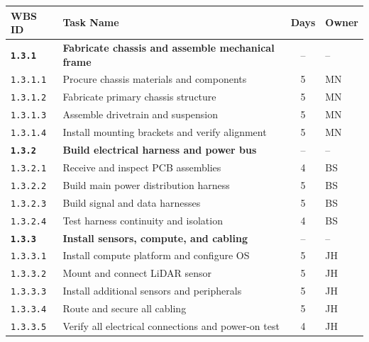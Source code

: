 \newpage
\begin{table}[H]
\centering
\small
\begin{tabular}{|l|p{6.5cm}|c|l|}
\hline
\rowcolor{buildorange!40}
\textbf{WBS ID} & \textbf{Task Name} & \textbf{Days} & \textbf{Owner} \\
\hline
\rowcolor{buildorange!35}
\texttt{\textbf{1.3.1}} & \textbf{Fabricate chassis and assemble mechanical frame} & -- & -- \\
\hline
\rowcolor{white}
\texttt{1.3.1.1} & \quad Procure chassis materials and components & 5 & MN \\
\hline
\rowcolor{buildorange!15}
\texttt{1.3.1.2} & \quad Fabricate primary chassis structure & 5 & MN \\
\hline
\rowcolor{white}
\texttt{1.3.1.3} & \quad Assemble drivetrain and suspension & 5 & MN \\
\hline
\rowcolor{buildorange!15}
\texttt{1.3.1.4} & \quad Install mounting brackets and verify alignment & 5 & MN \\
\hline
\rowcolor{buildorange!35}
\texttt{\textbf{1.3.2}} & \textbf{Build electrical harness and power bus} & -- & -- \\
\hline
\rowcolor{white}
\texttt{1.3.2.1} & \quad Receive and inspect PCB assemblies & 4 & BS \\
\hline
\rowcolor{buildorange!15}
\texttt{1.3.2.2} & \quad Build main power distribution harness & 5 & BS \\
\hline
\rowcolor{white}
\texttt{1.3.2.3} & \quad Build signal and data harnesses & 5 & BS \\
\hline
\rowcolor{buildorange!15}
\texttt{1.3.2.4} & \quad Test harness continuity and isolation & 4 & BS \\
\hline
\rowcolor{buildorange!35}
\texttt{\textbf{1.3.3}} & \textbf{Install sensors, compute, and cabling} & -- & -- \\
\hline
\rowcolor{white}
\texttt{1.3.3.1} & \quad Install compute platform and configure OS & 5 & JH \\
\hline
\rowcolor{buildorange!15}
\texttt{1.3.3.2} & \quad Mount and connect LiDAR sensor & 5 & JH \\
\hline
\rowcolor{white}
\texttt{1.3.3.3} & \quad Install additional sensors and peripherals & 5 & JH \\
\hline
\rowcolor{buildorange!15}
\texttt{1.3.3.4} & \quad Route and secure all cabling & 5 & JH \\
\hline
\rowcolor{white}
\texttt{1.3.3.5} & \quad Verify all electrical connections and power-on test & 4 & JH \\

\end{tabular}
\end{table}
